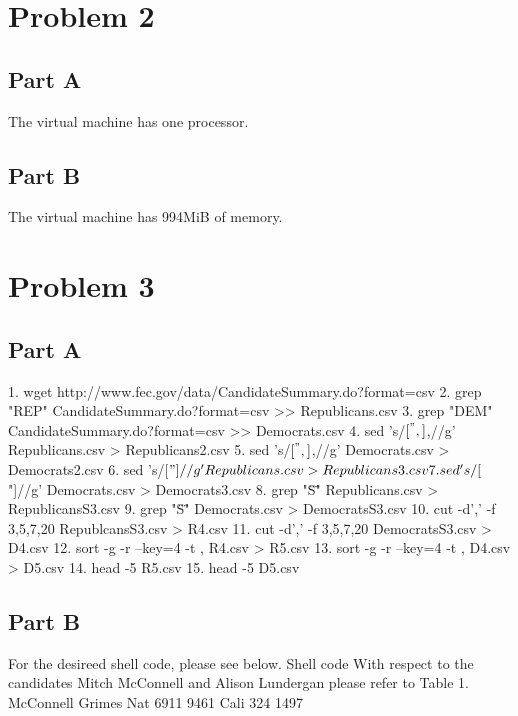 \section{Problem 2}
\subsection{Part A}
The virtual machine has one processor.
\subsection{Part B}
The virtual machine has 994MiB of memory.
\section{Problem 3}
\subsection{Part A}
1. wget http://www.fec.gov/data/CandidateSummary.do?format=csv
2. grep "REP" CandidateSummary.do?format=csv >> Republicans.csv
3. grep "DEM" CandidateSummary.do?format=csv >> Democrats.csv
4. sed 's/\([^",]\),/\1/g' Republicans.csv > Republicans2.csv
5. sed 's/\([^",]\),/\1/g' Democrats.csv > Democrats2.csv
6. sed 's/[$"]//g' Republicans.csv > Republicans3.csv
7. sed 's/[$"]//g' Democrats.csv > Democrats3.csv
8. grep "\"S\"" Republicans.csv > RepublicansS3.csv
9. grep "\"S\"" Democrats.csv > DemocratsS3.csv
10. cut -d',' -f 3,5,7,20 RepublcansS3.csv > R4.csv
11. cut -d',' -f 3,5,7,20 DemocratsS3.csv > D4.csv
12. sort -g -r --key=4 -t , R4.csv > R5.csv
13. sort -g -r --key=4 -t , D4.csv > D5.csv
14. head -5 R5.csv
15. head -5 D5.csv
\subsection{Part B}
For the desireed shell code, please see below.
	Shell code
With respect to the candidates Mitch McConnell and Alison Lundergan
please refer to Table 1.
McConnell	Grimes
Nat 6911	9461
Cali 324	1497

